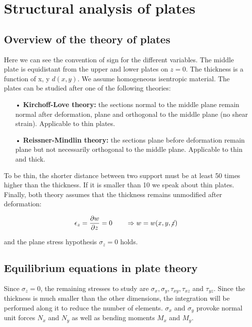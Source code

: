 
\chapter{Structural analysis of plates}
\section{Overview of the theory of plates}

	Here we can see the convention of sign for the different variables. The middle plate is equidistant from the upper and lower plates on $z=0$. The thickness is a function of x, y $d(x,y)$. We assume homogeneous isentropic material. The plates can be studied after one of the following theories: \\
	
	\begin{itemize}
	\item[•] \textbf{Kirchoff-Love theory:} the sections normal to the middle plane remain normal after deformation, plane and orthogonal to the middle plane (no shear strain). Applicable to thin plates. 
	\item[•] \textbf{Reissner-Mindlin theory:} the sections plane before deformation remain plane but not necessarily orthogonal to the middle plane. Applicable to thin and thick.\\
	\end{itemize}
	
	To be thin, the shorter distance between two support must be at least 50 times higher than the thickness. If it is smaller than 10 we speak about thin plates. Finally, both theory assumes that the thickness remains unmodified after deformation: 
	
	\begin{equation}
	\epsilon _z = \frac{\partial w}{\partial z} = 0 \qquad \Rightarrow w = w(x,y,\cancel{z})
	\end{equation}
	
	and the plane stress hypothesis $\sigma _z = 0$ holds. 
	
\section{Equilibrium equations in plate theory}
	Since $\sigma _z=0$, the remaining stresses to study are $\sigma _x, \sigma _y, \tau _{xy}, \tau _{xz}$ and $\tau _{yz}$. Since the thickness is much smaller than the other dimensions, the integration will be performed along it to reduce the number of elements. $\sigma _x$ and $\sigma _y$ provoke normal unit forces $N_x$ and $N_y$ as well as bending moments $M_x$ and $M_y$.\\
	
